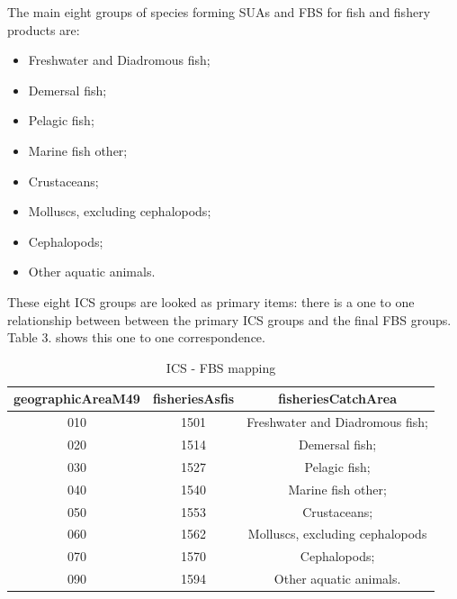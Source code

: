 \documentclass[nojss]{jss}
\begin{document}
The main eight groups of species forming SUAs and FBS for fish and fishery products are: 
\begin{itemize}
\item Freshwater and Diadromous fish;
\item Demersal fish;
\item Pelagic fish;
\item Marine fish other; 
\item Crustaceans; 
\item Molluscs, excluding cephalopods; 
\item Cephalopods; 
\item Other aquatic animals.
\end{itemize}

These eight ICS groups are looked as primary items: there is a one to one relationship between between the primary ICS groups and the final  FBS groups. Table 3. shows this one to one correspondence.

\begin{table}[t]
\caption{ICS - FBS mapping}
\centering
\begin{tabular}{c|c|c}
\toprule
geographicAreaM49 & fisheriesAsfis & fisheriesCatchArea \\
\midrule

       010 &  1501    & Freshwater and Diadromous fish; \\
       020 &  1514    & Demersal fish;                  \\ 
       030 &  1527    & Pelagic fish;                   \\
       040 &  1540    & Marine fish other;              \\
       050 &  1553    & Crustaceans;                    \\
       060 &  1562    & Molluscs, excluding cephalopods \\  
       070 &  1570    & Cephalopods;                    \\
       090 &  1594    & Other aquatic animals.          \\

\bottomrule
\end{tabular}
\label{tab:xxx}
\end{table}
\end{document}
